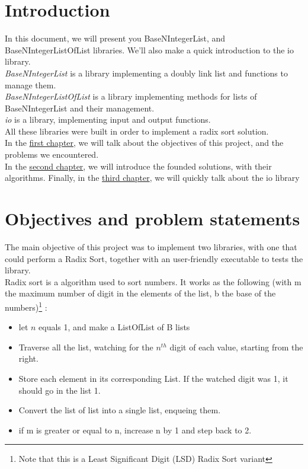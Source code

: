 \documentclass[book, backcover, english, nodocumentinfo]{upmethodology-document}
\begin{document}
\chapter*{Introduction}
In this document, we will present you BaseNIntegerList, and BaseNIntegerListOfList libraries. We'll also make a quick introduction to the io library.\\
\qquad \textit{BaseNIntegerList} is a library implementing a doubly link list and functions to manage them.\\
\qquad \textit{BaseNIntegerListOfList} is a library implementing methods for lists of BaseNIntegerList and their management.\\
\qquad \textit{io} is a library, implementing input and output functions.\\

All these libraries were built in order to implement a radix sort solution.\\

In the \hyperref[chapter:Objectives]{first chapter}, we will talk about the objectives of this project, and the problems we encountered.\\
In the \hyperref[chapter:Algorithms]{second chapter}, we will introduce the founded solutions, with their algorithms.
Finally, in the \hyperref[chapter:IO-Lib]{third chapter}, we will quickly talk about  the io library

\tableofcontents{}

\chapter{Objectives and problem statements} \label{chapter:Objectives}
The main objective of this project was to implement two libraries, with one that could perform a Radix Sort, together with an user-friendly executable to tests the library.\\
Radix sort is a algorithm used to sort numbers. It works as the following (with m the maximum number of digit in the elements of the list, b the base of the numbers)\footnote{Note that this is a Least Significant Digit (LSD) Radix Sort variant} :\\
\begin{itemize}
	\item[1]{} let \(n\) equals 1, and make a ListOfList of B lists
	\item[2]{} Traverse all the list, watching for the \(n^{th}\) digit of each value, starting from the right.
	\item[3]{} Store each element in its corresponding List. If the watched digit was 1, it should go in the  list 1.
	\item[4]{} Convert the list of list into a single list, enqueing them.
	\item[5]{} if m is greater or equal to n, increase n by 1 and step back to 2.
\end{itemize}
\end{document}
